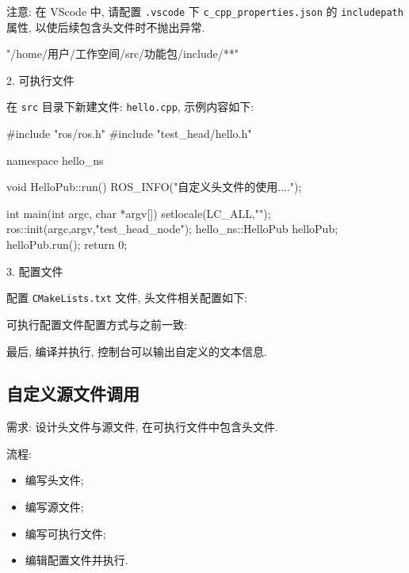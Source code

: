 \documentclass[openany, fontset=windowsold]{ctexbook}
\theoremstyle{kaiti}
\theoremstyle{normal}
\begin{document}
注意: 在 VScode 中, 请配置 \verb|.vscode| 下 \verb|c_cpp_properties.json| 的 \verb|includepath| 属性, 以使后续包含头文件时不抛出异常.

\begin{xml}
  "/home/用户/工作空间/src/功能包/include/**"
\end{xml}

2. 可执行文件

在 \verb|src| 目录下新建文件: \verb|hello.cpp|, 示例内容如下:

\begin{cpp}
  #include "ros/ros.h"
  #include "test_head/hello.h"

  namespace hello_ns {

  void HelloPub::run(){
      ROS_INFO("自定义头文件的使用....");
  }

  }

  int main(int argc, char *argv[])
  {
      setlocale(LC_ALL,"");
      ros::init(argc,argv,"test_head_node");
      hello_ns::HelloPub helloPub;
      helloPub.run();
      return 0;
  }
\end{cpp}

3. 配置文件

配置 \verb|CMakeLists.txt| 文件, 头文件相关配置如下:


可执行配置文件配置方式与之前一致:


最后, 编译并执行, 控制台可以输出自定义的文本信息.

\subsection{自定义源文件调用}

需求: 设计头文件与源文件, 在可执行文件中包含头文件.

流程:

\begin{itemize}
  \item 编写头文件; 
  \item 编写源文件; 
  \item 编写可执行文件; 
  \item 编辑配置文件并执行.
\end{itemize}
\end{document}

